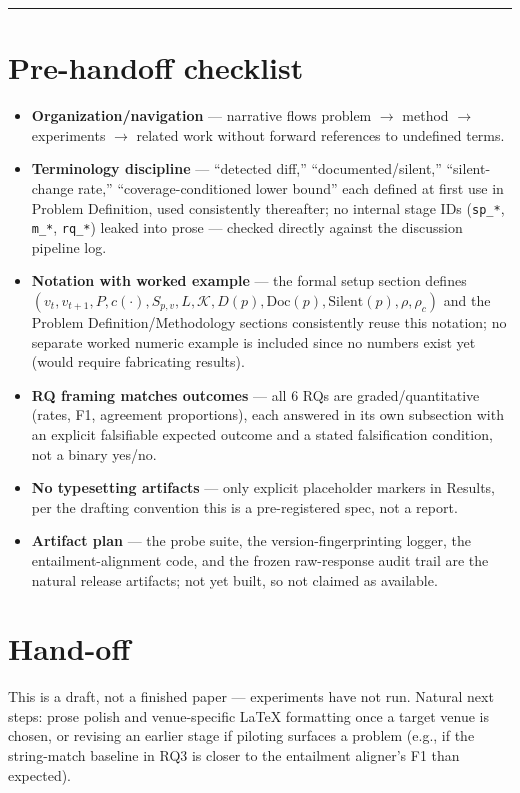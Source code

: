 \documentclass[11pt]{article}
\begin{document}
\vspace{1em}
\hrule
\vspace{1em}

\section*{Pre-handoff checklist}
\begin{itemize}[leftmargin=1.4em]
\item \textbf{Organization/navigation} --- narrative flows problem $\to$ method $\to$ experiments $\to$ related work without forward references to undefined terms.
\item \textbf{Terminology discipline} --- ``detected diff,'' ``documented/silent,'' ``silent-change rate,'' ``coverage-conditioned lower bound'' each defined at first use in Problem Definition, used consistently thereafter; no internal stage IDs (\texttt{sp\_*}, \texttt{m\_*}, \texttt{rq\_*}) leaked into prose --- checked directly against the discussion pipeline log.
\item \textbf{Notation with worked example} --- the formal setup section defines $(v_t, v_{t+1}, P, c(\cdot), S_{p,v}, L, \mathcal{K}, D(p), \mathrm{Doc}(p), \mathrm{Silent}(p), \rho, \rho_c)$ and the Problem Definition/Methodology sections consistently reuse this notation; no separate worked numeric example is included since no numbers exist yet (would require fabricating results).
\item \textbf{RQ framing matches outcomes} --- all 6 RQs are graded/quantitative (rates, F1, agreement proportions), each answered in its own subsection with an explicit falsifiable expected outcome and a stated falsification condition, not a binary yes/no.
\item \textbf{No typesetting artifacts} --- only explicit placeholder markers in Results, per the drafting convention this is a pre-registered spec, not a report.
\item \textbf{Artifact plan} --- the probe suite, the version-fingerprinting logger, the entailment-alignment code, and the frozen raw-response audit trail are the natural release artifacts; not yet built, so not claimed as available.
\end{itemize}

\section*{Hand-off}
This is a draft, not a finished paper --- experiments have not run. Natural next steps: prose polish and venue-specific LaTeX formatting once a target venue is chosen, or revising an earlier stage if piloting surfaces a problem (e.g., if the string-match baseline in RQ3 is closer to the entailment aligner's F1 than expected).



\end{document}
